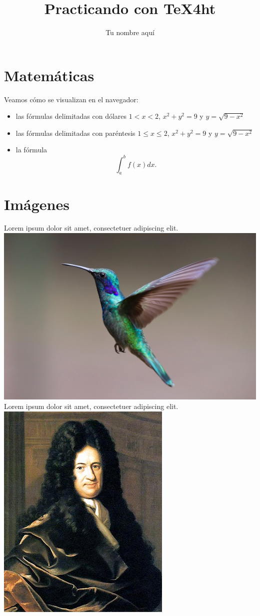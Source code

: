 \documentclass[12pt,a4paper,twoside]{article}
\title{Practicando con \TeX4ht{}}
\author{Tu nombre aquí}
\begin{document}
\maketitle


\section{Matemáticas}
Veamos cómo se visualizan en el navegador:

\begin{itemize}
	\item las fórmulas delimitadas con dólares $1<x<2$, $x^2+y^2=9$ y $y=\sqrt{9-x^2}$
	
	\item las fórmulas delimitadas con paréntesis \(1\le x \le 2\), \(x^2+y^2=9\) y  \(y=\sqrt{9-x^2}\)
	
	\item la fórmula \[\int_a^b f(x)dx.\]
\end{itemize}

\section{Imágenes}

\noindent Lorem ipsum dolor sit amet, consectetuer adipiscing elit.\\
\noindent\includegraphics[width=.4\textwidth]{images/bird.jpg}\\
\noindent Lorem ipsum dolor sit amet, consectetuer adipiscing elit.\\
\noindent\includegraphics[width=.4\textwidth]{images/GWLeibniz.png}
\end{document}
